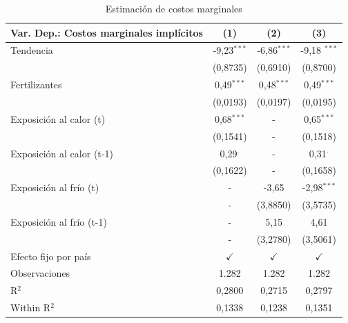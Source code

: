 \begin{table}[H]
   \caption{Estimación de costos marginales}
   \label{tab:estimacion_costos_2}
   \bigskip
   \centering
   \begin{tabular}{lccc}

      \hline 
      
      Var. Dep.: Costos marginales implícitos                     & (1) & (2) & (3)\\   
      \hline

      Tendencia             & -9,23$^{***}$ & -6,86$^{***}$ & -9,18 $^{***}$ \\   
                           & (0,8735) & (0,6910) & (0,8700) \\   
      Fertilizantes        & 0,49$^{***}$ & 0,48$^{***}$ & 0,49$^{***}$ \\   
                           & (0,0193) & (0,0197) & (0,0195)\\   
      Exposición al calor (t)      & 0,68$^{***}$ & - & 0,65$^{***}$ \\   
                           & (0,1541) & - & (0,1518) \\   
      Exposición al calor (t-1)      & 0,29$^{.}$ & - & 0,31$^{.}$ \\   
                           & (0,1622) & - & (0,1658)\\   
      Exposición al frío (t)      & - & -3,65 & -2,98$^{***}$ \\   
                           & - & (3,8850) & (3,5735)\\   
      Exposición al frío (t-1)      & - & 5,15 & 4,61\\   
                           & - & (3,2780) & (3,5061)\\  
      \hline
      Efecto fijo por país & $\checkmark$ & $\checkmark$ & $\checkmark$ \\  
      \hline
      Observaciones          & 1.282 & 1.282 & 1.282\\  
      R$^2$                 & 0,2800 & 0,2715 & 0,2797\\  
      Within R$^2$          & 0,1338 & 0,1238 & 0,1351\\        
      \bottomrule
   \end{tabular}
   \par \raggedright 
\end{table}
